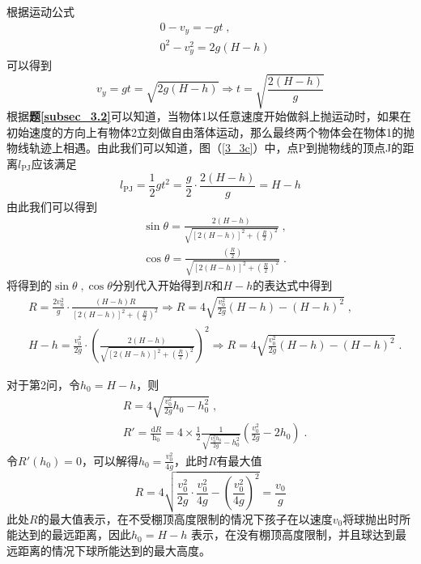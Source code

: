 \noindent
根据运动公式
\[
\begin{aligned}
& 0 - v_y = -gt\;,\\
& 0^2 - v_y^2 = 2g(H-h)
\end{aligned}
\]
可以得到
\[
v_y = gt = \sqrt{2g(H-h)} \Rightarrow t = \sqrt{\frac{2(H-h)}{g}}
\]
根据{\bfseries 题\ref{subsec_3.2}}可以知道，当物体1以任意速度开始做斜上抛运动时，如果在初始速度的方向上有物体2立刻做自由落体运动，那么最终两个物体会在物体1的抛物线轨迹上相遇。由此我们可以知道，图（\ref{3_3c}）中，点P到抛物线的顶点J的距离$l_{\text{PJ}}$应该满足
\[
l_{\text{PJ}} = \frac{1}{2}gt^2 = \frac{g}{2} \cdot \frac{2(H-h)}{g} = H - h
\]
由此我们可以得到
\[
\begin{aligned}
& \sin \theta = \frac{2(H - h)}{\sqrt{[2(H - h)]^2 + (\frac{R}{2})^2}}\;,\\
& \cos \theta = \frac{(\frac{R}{2})}{\sqrt{[2(H - h)]^2 + (\frac{R}{2})^2}}\;.
\end{aligned}
\]
将得到的$\sin \theta\;,\cos \theta$分别代入开始得到$R$和$H - h$的表达式中得到
\[
\begin{aligned}
& R = \frac{2v_0^2}{g} \cdot \frac{(H-h)R}{[2(H - h)]^2 + (\frac{R}{2})^2} \Rightarrow R = 4\sqrt{\frac{v_0^2}{2g}(H-h) - (H-h)^2}\;,\\
& H-h = \frac{v_0^2}{2g} \cdot \left(\frac{2(H - h)}{\sqrt{[2(H - h)]^2 + (\frac{R}{2})^2}}\right)^2 \Rightarrow R = 4\sqrt{\frac{v_0^2}{2g}(H-h) - (H-h)^2}\;.
\end{aligned}
\]

\noindent
对于第2问，令$h_0 = H - h$，则
\[
\begin{aligned}
& R = 4\sqrt{\frac{v_0^2}{2g}h_0 - h_0^2}\;,\\
& R' = \frac{\mathrm{d}R}{\mathrm{h_0}} = 4\times \frac{1}{2}\frac{1}{\sqrt{\frac{v_0^2h_0}{2g} - h_0^2}}(\frac{v_0^2}{2g} - 2h_0)\;.
\end{aligned}
\]
令$R'(h_0) = 0$，可以解得$h_0 = \frac{v_0^2}{4g}$，此时$R$有最大值
\[
R = 4\sqrt{ \frac{v_0^2}{2g}\cdot\frac{v_0^2}{4g} - ( \frac{v_0^2}{4g})^2} = \frac{v_0}{g}
\]
此处$R$的最大值表示，在不受棚顶高度限制的情况下孩子在以速度$v_0$将球抛出时所能达到的最远距离，因此$h_0 = H - h$ 表示，在没有棚顶高度限制，并且球达到最远距离的情况下球所能达到的最大高度。
